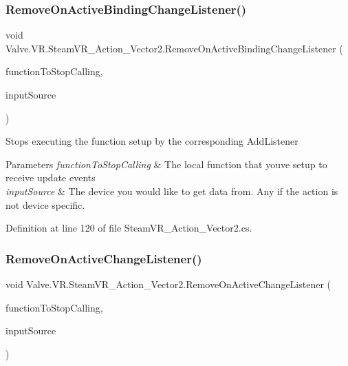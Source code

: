 \subsubsection{\texorpdfstring{RemoveOnActiveBindingChangeListener()}{RemoveOnActiveBindingChangeListener()}}
{\footnotesize\ttfamily void Valve.\+V\+R.\+Steam\+V\+R\+\_\+\+Action\+\_\+\+Vector2.\+Remove\+On\+Active\+Binding\+Change\+Listener (\begin{DoxyParamCaption}\item[{\mbox{\hyperlink{class_valve_1_1_v_r_1_1_steam_v_r___action___vector2_ad01c83284de71c0d9cd8f7e673ce5ab5}{Active\+Change\+Handler}}}]{function\+To\+Stop\+Calling,  }\item[{\mbox{\hyperlink{namespace_valve_1_1_v_r_a82e5bf501cc3aa155444ee3f0662853f}{Steam\+V\+R\+\_\+\+Input\+\_\+\+Sources}}}]{input\+Source }\end{DoxyParamCaption})}



Stops executing the function setup by the corresponding Add\+Listener 


\begin{DoxyParams}{Parameters}
{\em function\+To\+Stop\+Calling} & The local function that you\textquotesingle{}ve setup to receive update events\\
\hline
{\em input\+Source} & The device you would like to get data from. Any if the action is not device specific.\\
\hline
\end{DoxyParams}


Definition at line 120 of file Steam\+V\+R\+\_\+\+Action\+\_\+\+Vector2.\+cs.

\mbox{\label{class_valve_1_1_v_r_1_1_steam_v_r___action___vector2_a7cceff632cff0062c1a2018032e84600}} 
\subsubsection{\texorpdfstring{RemoveOnActiveChangeListener()}{RemoveOnActiveChangeListener()}}
{\footnotesize\ttfamily void Valve.\+V\+R.\+Steam\+V\+R\+\_\+\+Action\+\_\+\+Vector2.\+Remove\+On\+Active\+Change\+Listener (\begin{DoxyParamCaption}\item[{\mbox{\hyperlink{class_valve_1_1_v_r_1_1_steam_v_r___action___vector2_ad01c83284de71c0d9cd8f7e673ce5ab5}{Active\+Change\+Handler}}}]{function\+To\+Stop\+Calling,  }\item[{\mbox{\hyperlink{namespace_valve_1_1_v_r_a82e5bf501cc3aa155444ee3f0662853f}{Steam\+V\+R\+\_\+\+Input\+\_\+\+Sources}}}]{input\+Source }\end{DoxyParamCaption})}



